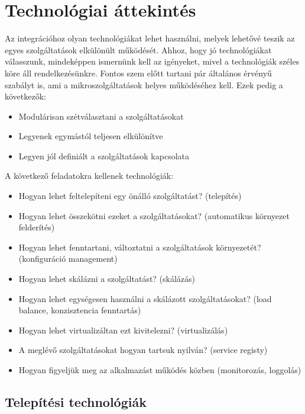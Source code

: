 \documentclass[11pt,magyar,a4paper,twoside,]{report}
\providecommand{\tightlist}{%
  \setlength{\itemsep}{0pt}\setlength{\parskip}{0pt}}
\begin{document}
\section{Technológiai
áttekintés}\label{technoluxf3giai-uxe1ttekintuxe9s}

Az integrációhoz olyan technológiákat\citep{micro-introPt1} lehet
használni, melyek lehetővé teszik az egyes szolgáltatások elkülönült
működését. Ahhoz, hogy jó technológiákat válasszunk, mindeképpen
ismernünk kell az igényeket, mivel a technológiák széles köre áll
rendelkezésünkre. Fontos szem előtt tartani pár általános érvényű
szabályt is\citep{micro-golden}, ami a mikroszolgáltatások helyes
működéséhez kell. Ezek pedig a következők:

\begin{itemize}
\tightlist
\item
  Modulárisan szétválasztani a szolgáltatásokat
\item
  Legyenek egymástól teljesen elkülönítve
\item
  Legyen jól definiált a szolgáltatások kapcsolata
\end{itemize}

A következő feladatokra kellenek technológiák:

\begin{itemize}
\tightlist
\item
  Hogyan lehet feltelepíteni egy önálló szolgáltatást? (telepítés)
\item
  Hogyan lehet összekötni ezeket a szolgáltatásokat? (automatikus
  környezet felderítés)
\item
  Hogyan lehet fenntartani, változtatni a szolgáltatások környezetét?
  (konfiguráció management)
\item
  Hogyan lehet skálázni a szolgáltatást? (skálázás)
\item
  Hogyan lehet egységesen használni a skálázott szolgáltatásokat? (load
  balance, konzisztencia fenntartás)
\item
  Hogyan lehet virtualizáltan ezt kivitelezni? (virtualizálás)
\item
  A meglévő szolgáltatásokat hogyan tartsuk nyilván? (service registy)
\item
  Hogyan figyeljük meg az alkalmazást működés közben (monitorozás,
  loggolás)
\end{itemize}

\subsection{Telepítési
technológiák}\label{telepuxedtuxe9si-technoluxf3giuxe1k}
\end{document}
